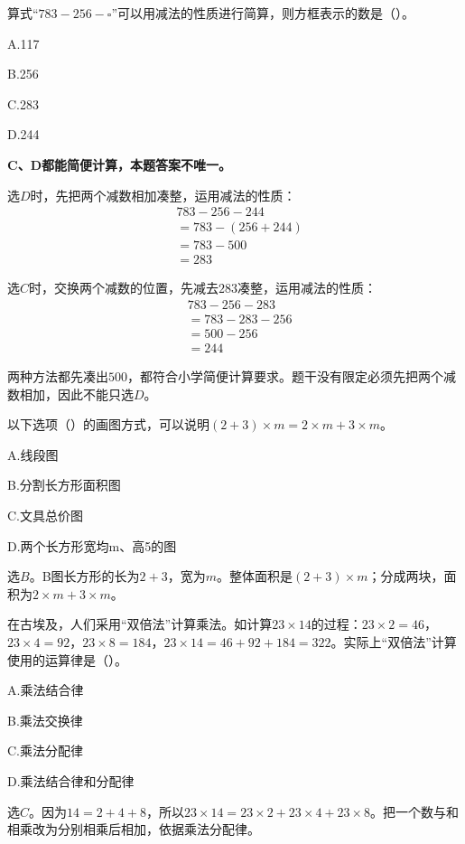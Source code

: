 算式“\(783-256-\square\)”可以用减法的性质进行简算，则方框表示的数是（\hspace{1.8em}）。\par
\noindent A.117\par
\noindent B.256\par
\noindent C.283\par
\noindent D.244\par
\begin{BookAnswer}
\textbf{C、D都能简便计算，本题答案不唯一。}\par 选\(D\)时，先把两个减数相加凑整，运用减法的性质：\[\begin{aligned}&783-256-244\\&=783-(256+244)\\&=783-500\\&=283\end{aligned}\]\par 选\(C\)时，交换两个减数的位置，先减去\(283\)凑整，运用减法的性质：\[\begin{aligned}&783-256-283\\&=783-283-256\\&=500-256\\&=244\end{aligned}\]\par 两种方法都先凑出\(500\)，都符合小学简便计算要求。题干没有限定必须先把两个减数相加，因此不能只选\(D\)。
\end{BookAnswer}

以下选项（\hspace{1.8em}）的画图方式，可以说明\((2+3)\times m=2\times m+3\times m\)。\par
\noindent A.线段图\par
\noindent B.分割长方形面积图\par
\noindent C.文具总价图\par
\noindent D.两个长方形宽均m、高5的图\par
{}
\begin{BookAnswer}
选\(B\)。B图长方形的长为\(2+3\)，宽为\(m\)。整体面积是\((2+3)\times m\)；分成两块，面积为\(2\times m+3\times m\)。
\end{BookAnswer}

在古埃及，人们采用“双倍法”计算乘法。如计算\(23\times14\)的过程：\(23\times2=46\)，\allowbreak{}\(23\times4=92\)，\allowbreak{}\(23\times8=184\)，\allowbreak{}\(23\times14=46+92+184=322\)。实际上“双倍法”计算使用的运算律是（\hspace{1.8em}）。\par
\noindent A.乘法结合律\par
\noindent B.乘法交换律\par
\noindent C.乘法分配律\par
\noindent D.乘法结合律和分配律\par
\begin{BookAnswer}
选\(C\)。因为\(14=2+4+8\)，所以\(23\times14=23\times2+23\times4+23\times8\)。把一个数与和相乘改为分别相乘后相加，依据乘法分配律。
\end{BookAnswer}

